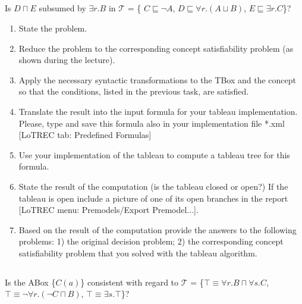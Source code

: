 \documentclass[11pt]{article} %
\begin{document}
\subsection{}

\begin{center}
Is $D \sqcap E$ subsumed by $\exists r.B$ in $\mathcal{T}$ = \{ $C \sqsubseteq \neg A$, $D \sqsubseteq \forall r.(A \sqcup B)$, $E \sqsubseteq \exists r.C$\}?
\end{center}

\begin{enumerate}
\item State the problem.
\item Reduce the problem to the corresponding concept satisfiability problem (as shown during the lecture).
\item Apply the necessary syntactic transformations to the TBox and the concept so that the conditions, listed in the previous task, are satisfied.
\item Translate the result into the input formula for your tableau implementation. Please, type and save this formula also in your implementation file *.xml [LoTREC tab: Predefined Formulas]
\item Use your implementation of the tableau to compute a tableau tree for this formula.
\item State the result of the computation (is the tableau closed or open?) If the tableau is open include a picture of one of its open branches in the report [LoTREC menu: Premodels/Export Premodel...].
\item Based on the result of the computation provide the answers to the following problems: 1) the original decision problem; 2) the corresponding concept satisfiability problem that you solved with the tableau algorithm.
\end{enumerate}

\subsection{}

\begin{center}
Is the ABox \{$C(a)$\} consistent with regard to $\mathcal{T}$ = \{$\top \equiv \forall r.B \sqcap \forall s.C$, $\top \equiv \neg \forall r.(\neg C \sqcap B)$, $\top \equiv \exists s.\top$\}?
\end{center}
\end{document}
